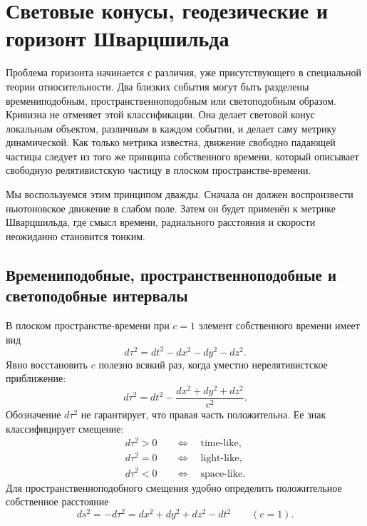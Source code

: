 \chapter{Световые конусы, геодезические и горизонт Шварцшильда}

Проблема горизонта начинается с различия, уже присутствующего в специальной теории относительности. Два близких события могут быть разделены времениподобным, пространственноподобным или светоподобным образом. Кривизна не отменяет этой классификации. Она делает световой конус локальным объектом, различным в каждом событии, и делает саму метрику динамической. Как только метрика известна, движение свободно падающей частицы следует из того же принципа собственного времени, который описывает свободную релятивистскую частицу в плоском пространстве-времени.

Мы воспользуемся этим принципом дважды. Сначала он должен воспроизвести ньютоновское движение в слабом поле. Затем он будет применён к метрике Шварцшильда, где смысл времени, радиального расстояния и скорости неожиданно становится тонким.

\section{Времениподобные, пространственноподобные и светоподобные интервалы}

В плоском пространстве-времени при \(c=1\) элемент собственного времени имеет вид
\begin{equation}
d\tau^2=dt^2-dx^2-dy^2-dz^2.
\label{eq:l5-minkowski-proper-time}
\end{equation}
Явно восстановить \(c\) полезно всякий раз, когда уместно нерелятивистское приближение:
\begin{equation}
d\tau^2
=dt^2-\frac{dx^2+dy^2+dz^2}{c^2}.
\label{eq:l5-minkowski-c}
\end{equation}
Обозначение \(d\tau^2\) не гарантирует, что правая часть положительна. Ее знак классифицирует смещение:
\begin{align}
d\tau^2>0
&\quad\Longleftrightarrow\quad \text{time-like},\\
d\tau^2=0
&\quad\Longleftrightarrow\quad \text{light-like},\\
d\tau^2<0
&\quad\Longleftrightarrow\quad \text{space-like}.
\end{align}
Для пространственноподобного смещения удобно определить положительное собственное расстояние
\begin{equation}
ds^2=-d\tau^2
=dx^2+dy^2+dz^2-dt^2
\qquad(c=1).
\label{eq:l5-proper-distance}
\end{equation}

